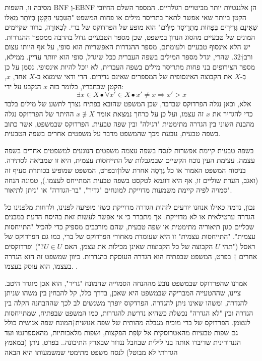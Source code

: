     מסיבה זו, השפות BNF וְ-EBNF הן אלגנטיות יותר מביטויים רגולריים.
    המספר השלם החיובי הקטן ביותר שאי אפשר לתאר בתריסר מילים או פחות
    המשפט "הַטִּבְעִי הַקָּטָן בְּיוֹתֵר מֵאֵלּו שֶׁאֵינָם גְּדִירִים בְּפָחוֹת מִתְּרֵיסָר מִלִּים" הוא מופע של הפרדוקס של ברי. לִכְאוֹרָה, ברור שקיימים המונים של טבעיים מהסוג הנדון במשפט, שכן מספר הטבעיים גדול בהרבה ממספר ההגדרות. יש הלא אינסוף טבעיים ולעומתם, מספר ההגדרות האפשריות הוא סופי, על אף היותו עצום ורב†{32}. שהרי, יגדל מספר המילים בשפה העברית ככל שיגדל, סופי הוא יוותר עדיין. ממילא, מספר הצירופים בני פחות מתריסר מילים בשפה העברית, לא יוכל להיות אינסופי.
    נסמן על כן בְּ-$X$ את הקבוצה האינסופית של המספרים שאינם גדירים. הרי ודאי שימצא ב-$X$ אחד, $x$, הקטן שבחבריו, כלומר כזה $x$ הנקבע על ידי:
  \[
    ∃x∈X ∙ ∀x'∈X ∙ x'≠x ⇒ x'>x
  \]
    אלא, וכאן נגלה הפרדוקס שבדבר, שכן המשפט שהובא בפתיח נצרך לתשע של מילים בלבד כדי להגדיר את $x$ זה עצמו, ועל כן על כרחך נמצאת אומר $x∌X$
    ההיתר של הפרדוקס נגלה מהבנת השוני בין הגדרה מתימטית "רגילה" ובין שפה טבעית. הפרדוקס שבמשפט, אשר כתוב בשפה טבעית, נובעת מכך שהמשפט מדבר על משפטים אחרים בשפה הטבעית. 
    
    בשפה טבעית קיימת אפשרות לנסח בשפה עצמה משפטים הנוגעים למשפטים אחרים בשפה עצמה. עצימת העין נוכח הקשיים שבמגבלות של התייחסות עצמית, היא זו שמביאה לסתירה.
    בניסוח המשפט האמור או כל גִּרְסָה אחרת שלו†{ובפרט, המשפט שמופיע בכותרת סעיף זה (ואגב, הערת שוליים זו, אף היא דוגמא לטקסט בשפה טבעית המתייחס לעצמו.)}, טמונה הנחה סמויה לפיה קיימת משמעות מדוייקת למונחים "גדיר", "בר-הגדרה" או "ניתן לתיאור".

    נכון, נדמה כאילו אנחנו יודעים לזהות הגדרה מדוייקת כשזו מופיעה לפנינו, ולדחות מלפנינו כל הגדרה ערטילאית או לא מדוייקת. אך מתברר כי אי אפשר לעשות זאת בהיסח הדעת במבנים שכליים כגון תיאוריה מתימטית או שפה טבעית, שהם מורכבים מספיק כדי להכיל "התייחסות עצמית". "התייחסות עצמית" זו היא שעומדת מאחורי הפרדוקס של ברי, כמו גם הפרדוקס של ראסל ("תהי $U$ הקבוצה של כל הקבוצות שאינן מכילות את עצמן, האם $U∈U$?") ופרדוקסים אחרים%
    †{
    בפרט, המשפט שבפתיח הוא הגדרה העוסקת בהגדרות. כיוון שמשפט זה הוא הגדרה בעצמו, הוא עוסק בעצמו. }.

    
    אמרנו שהפרדוקס שבמשפט נובע מההנחה הסמוייה שהמונח "גדיר", הוא אכן מוגדר היטב. ציינו, שההטעייה המבריקה שבמשפט היא שאכן, בדרך כלל, קל להבחין בין משהו שניתן להגדרה, ומשהו שאינו ניתן להגדרה. הפרדקוס יופרך משנשים לב לכך שההבחנה הקלה בין הגדרה ובין "לא הגדרה" נכשלת כשהיא נדרשת להגדרות, כמו המשפט שבפתיח, שמתייחסות לעצמן. הפרדוקס של ברי מוכיח מגבלה מהותית של שפה אנושית†{המונח שפה אנושית כולל גם שפות טבעיות מהאטרוסקית אל שְׂפַת הפקצות, ושפות מלאכותיות, מהאספרנטו ועד הננדורינית שדיברו אותה בני לילית שבחבל ננדור שבארץ התיכונה.}. בפרט, ניתן (במאמץ הגדרתי לא מבוטל) לנסח משפט מתימטי שמשמעותו היא הבאה
    
